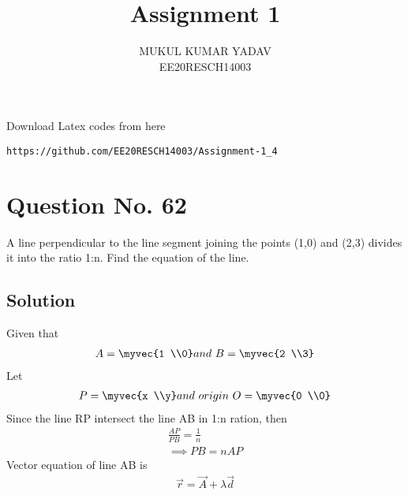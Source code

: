 \documentclass[journal,12pt,twocolumn]{IEEEtran}
\begin{document}
     \def\rightbox#1{\makebox[0in][r]{#1}}
     \def\centbox#1{\makebox[0in]{#1}}
     \def\topbox#1{\raisebox{-\baselineskip}[0in][0in]{#1}}
     \def\midbox#1{\raisebox{-0.5\baselineskip}[0in][0in]{#1}}
\vspace{3cm}
\title{Assignment 1}
\author{MUKUL KUMAR YADAV\\ EE20RESCH14003}
\maketitle
\newpage
\bigskip
\renewcommand{\thefigure}{\theenumi}
\renewcommand{\thetable}{\theenumi}
 Download Latex codes from here
\begin{lstlisting}
https://github.com/EE20RESCH14003/Assignment-1_4
\end{lstlisting}
%

%

%
\section{\textbf{Question No. 62}}
A line perpendicular to the line segment joining the points (1,0) and (2,3) divides it into the ratio 1:n. Find the equation of the line.

\subsection{\textbf{Solution}}

\begin{center}
    
\end{center} 
Given that
\begin{align}
A=\myvec{1 \\0}  and \ B= \myvec{2 \\3}
\end{align}
Let 
\begin{align}
P= \myvec{x \\y}  and \ origin \ O = \myvec{0 \\0}
\end{align}
Since the line RP intersect the line AB in 1:n ration, then 
\begin{align}
 \frac{AP}{PB} = \frac{1}{n} \\
 \implies PB = nAP  
\end{align}
Vector equation of line AB is 
\begin{align}
\vec{r} = \vec{A}+\lambda\vec{d} 
\end{align}
\end{document}
